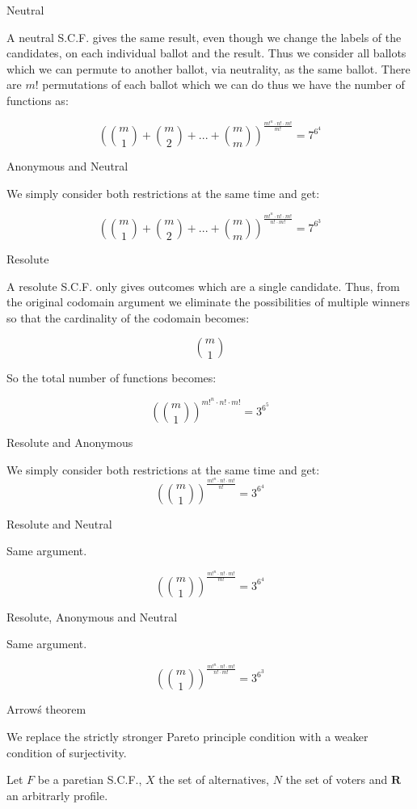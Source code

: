 \documentclass[12pt]{article}
\newenvironment{question}[2][Question]{\begin{trivlist}
\item[\hskip \labelsep {\bfseries #1}\hskip \labelsep {\bfseries #2.}]}{\end{trivlist}}
\newenvironment{answer}[2][Answer]{\begin{trivlist}
\item[\hskip \labelsep {\bfseries #1}\hskip \labelsep {\bfseries #2:}]}{\end{trivlist}}
\begin{document}
\begin{answer}{c)}{Neutral}

A neutral S.C.F. gives the same result, even though we change the labels of the candidates, on each individual ballot and the result. Thus we consider all ballots which we can permute to another ballot, via neutrality, as the same ballot. There are $m!$ permutations of each ballot which we can do thus we have the number of functions as:

$$(\binom{m}{1} + \binom{m}{2} + ... + \binom{m}{m})^{\frac{m!^n \cdot n! \cdot m!}{m!}}=7^{6^4}$$
\end{answer}
\begin{answer}{d)}{Anonymous and Neutral}

We simply consider both restrictions at the same time and get:

$$(\binom{m}{1} + \binom{m}{2} + ... + \binom{m}{m})^{\frac{m!^n \cdot n! \cdot m!}{n! \cdot m!}}=7^{6^3}$$
\end{answer}
\begin{answer}{e)}{Resolute}

A resolute S.C.F. only gives outcomes which are a single candidate. Thus, from the original codomain argument we eliminate the possibilities of multiple winners so that the cardinality of the codomain becomes:

$$\binom{m}{1}$$

So the total number of functions becomes:

$$(\binom{m}{1})^{m!^n \cdot n! \cdot m!}=3^{6^5}$$
\end{answer}
\begin{answer}{f)}{Resolute and Anonymous}

We simply consider both restrictions at the same time and get:
$$(\binom{m}{1})^{\frac{m!^n \cdot n! \cdot m!}{n!}}=3^{6^4}$$
\end{answer}
\begin{answer}{g)}{Resolute and Neutral}

Same argument.

$$(\binom{m}{1})^{\frac{m!^n \cdot n! \cdot m!}{m!}}=3^{6^4}$$
\end{answer}
\begin{answer}{h)}{Resolute, Anonymous and Neutral}

Same argument.

$$(\binom{m}{1})^{\frac{m!^n \cdot n! \cdot m!}{n! \cdot m!}}=3^{6^3}$$
\end{answer}
\begin{question}{4}{Arrow\'s theorem}

We replace the strictly stronger Pareto principle condition with a weaker condition of surjectivity.

Let $F$ be a paretian S.C.F., $X$ the set of alternatives, $N$ the set of voters and $\boldsymbol{R}$ an arbitrarly profile.
\end{question}
\end{document}

